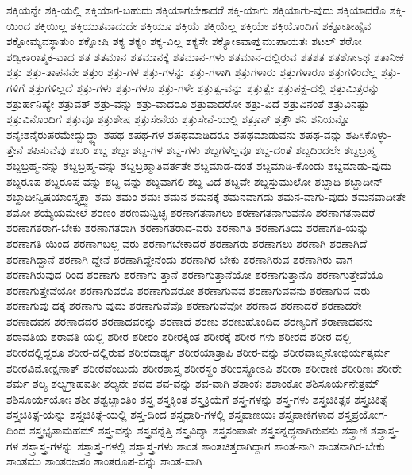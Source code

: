 {ಶಕ್ತಿಯನ್ನೇ
ಶಕ್ತಿ-ಯಲ್ಲಿ
ಶಕ್ತಿಯಾಗ-ಬಹುದು
ಶಕ್ತಿಯಾಗಬೇಕಾದರೆ
ಶಕ್ತಿ-ಯಾಗು
ಶಕ್ತಿಯಾಗು-ವುದು
ಶಕ್ತಿಯಾದರೊ
ಶಕ್ತಿ-ಯಿಂದ
ಶಕ್ತಿಯಿಲ್ಲ
ಶಕ್ತಿಯುತವಾದುದೇ
ಶಕ್ತಿಯೂ
ಶಕ್ತಿಯೆ
ಶಕ್ತಿಯೆಲ್ಲ
ಶಕ್ತಿಯೇ
ಶಕ್ತಿಯೊಂದಿಗೆ
ಶಕ್ನೋತೀಹೈವ
ಶಕ್ನೋಮ್ಯವಸ್ಥಾತುಂ
ಶಕ್ನೋಷಿ
ಶಕ್ಯ
ಶಕ್ಯಂ
ಶಕ್ಯ-ವಿಲ್ಲ
ಶಕ್ಯಸೇ
ಶಕ್ಯೋಽವಾಪ್ತುಮುಪಾಯತಃ
ಶಟಲ್
ಶಠೋ
ಶಡ್ವಿಕಾರಾತ್ಮಕ-ವಾದ
ಶತ
ಶತಮಾನ
ಶತಮಾನಕ್ಕೆ
ಶತಮಾನ-ಗಳು
ಶತಮಾನ-ದಲ್ಲಿರುವ
ಶತಶತ
ಶತಶೋಽಥ
ಶತಾನೀಕ
ಶತ್ರು
ಶತ್ರು-ತಾಪನನೇ
ಶತ್ರುಂ
ಶತ್ರು-ಗಳ
ಶತ್ರು-ಗಳನ್ನು
ಶತ್ರು-ಗಳಾಗಿ
ಶತ್ರುಗಳಾರು
ಶತ್ರುಗಳಾರೂ
ಶತ್ರುಗಳಿಂದೆಲ್ಲ
ಶತ್ರು-ಗಳಿಗೆ
ಶತ್ರುಗಳಿಲ್ಲದೆ
ಶತ್ರು-ಗಳು
ಶತ್ರು-ಗಳೂ
ಶತ್ರು-ಗಳೇ
ಶತ್ರುತ್ವ-ವನ್ನು
ಶತ್ರುತ್ವೇ
ಶತ್ರುಪಕ್ಷ-ದಲ್ಲಿ
ಶತ್ರುಮಿತ್ರರನ್ನು
ಶತ್ರುರ್ಹನಿಷ್ಯೇ
ಶತ್ರುವತ್
ಶತ್ರು-ವನ್ನು
ಶತ್ರು-ವಾದರೂ
ಶತ್ರುವಾದರೋ
ಶತ್ರು-ವಿದೆ
ಶತ್ರುವಿನಂತೆ
ಶತ್ರುವಿನಷ್ಟು
ಶತ್ರುವಿನೊಂದಿಗೆ
ಶತ್ರುವೂ
ಶತ್ರುಶೇಷ
ಶತ್ರುಸೇನೆಯ
ಶತ್ರುಸೇನೆ-ಯಲ್ಲಿ
ಶತ್ರೂನ್
ಶತ್ರೌ
ಶನಿ
ಶನಿಯನ್ನೊ
ಶನೈಃಶನೈರುಪರಮೇದ್ಬುದ್ಧ್ಯಾ
ಶಪಥ
ಶಪಥ-ಗಳ
ಶಪಥಮಾಡಿದರೂ
ಶಪಥಮಾಡುವನು
ಶಪಥ-ವನ್ನು
ಶಪಿಸಿಕೊಳ್ಳು-ತ್ತೇನೆ
ಶಪಿಸುವೆವು
ಶಬರಿ
ಶಬ್ದ
ಶಬ್ದಃ
ಶಬ್ದ-ಗಳ
ಶಬ್ದ-ಗಳು
ಶಬ್ದಗಳೆಲ್ಲವೂ
ಶಬ್ದ-ದಂತೆ
ಶಬ್ದದಿಂದಲೇ
ಶಬ್ದಬ್ರಹ್ಮ
ಶಬ್ದಬ್ರಹ್ಮ-ನನ್ನು
ಶಬ್ದಬ್ರಹ್ಮ-ವನ್ನು
ಶಬ್ದಬ್ರಹ್ಮಾತಿವರ್ತತೇ
ಶಬ್ದಮಾಡ-ದಂತೆ
ಶಬ್ದಮಾಡಿ-ಕೊಂಡು
ಶಬ್ದಮಾಡು-ವುದು
ಶಬ್ದರೂಪ
ಶಬ್ದರೂಪ-ವನ್ನು
ಶಬ್ದ-ವನ್ನು
ಶಬ್ದವಾಗಲಿ
ಶಬ್ದ-ವಿದೆ
ಶಬ್ದವೇ
ಶಬ್ದಸ್ತುಮುಲೋ
ಶಬ್ದಾದಿ
ಶಬ್ದಾದೀನ್
ಶಬ್ದಾದೀನ್ವಿಷಯಾಂಸ್ತ್ಯಕ್ತ್ವಾ
ಶಮ
ಶಮಂ
ಶಮಃ
ಶಮನ
ಶಮನಕ್ಕೆ
ಶಮನವಾಗದು
ಶಮನ-ವಾಗು-ವುದು
ಶಮನವಾದೀತೇ
ಶಮೋ
ಶಯ್ಯೆಯಮೇಲೆ
ಶರಣಂ
ಶರಣಮನ್ವಿಚ್ಛ
ಶರಣಾಗತನಾಗಲು
ಶರಣಾಗತನಾಗುವನೊ
ಶರಣಾಗತನಾದರೆ
ಶರಣಾಗತರಾಗ-ಬೇಕು
ಶರಣಾಗತರಾಗಿ
ಶರಣಾಗತರಾದ-ವರು
ಶರಣಾಗತಿ
ಶರಣಾಗತಿಯ
ಶರಣಾಗತಿ-ಯನ್ನು
ಶರಣಾಗತಿ-ಯಿಂದ
ಶರಣಾಗಬಲ್ಲ-ವರು
ಶರಣಾಗಬೇಕಾದರೆ
ಶರಣಾಗರು
ಶರಣಾಗಲು
ಶರಣಾಗಿ
ಶರಣಾಗಿದೆ
ಶರಣಾಗಿದ್ದಾನೆ
ಶರಣಾಗಿ-ದ್ದೇನೆ
ಶರಣಾಗಿದ್ದೇನೆಂದು
ಶರಣಾಗಿರ-ಬೇಕು
ಶರಣಾಗಿರುವ
ಶರಣಾಗಿರು-ವಾಗ
ಶರಣಾಗಿರುವುದ-ರಿಂದ
ಶರಣಾಗು
ಶರಣಾಗು-ತ್ತಾನೆ
ಶರಣಾಗುತ್ತಾನೆಯೋ
ಶರಣಾಗುತ್ತಾನೊ
ಶರಣಾಗುತ್ತೇವೆಯೊ
ಶರಣಾಗುತ್ತೇವೆಯೋ
ಶರಣಾಗುವರೊ
ಶರಣಾಗುವರೋ
ಶರಣಾಗುವವ
ಶರಣಾಗುವವನು
ಶರಣಾಗುವ-ವರು
ಶರಣಾಗುವು-ದಕ್ಕೆ
ಶರಣಾಗು-ವುದು
ಶರಣಾಗುವೆವೊ
ಶರಣಾಗುವೆವೋ
ಶರಣಾದ
ಶರಣಾದರೆ
ಶರಣಾದರೇ
ಶರಣಾದವನ
ಶರಣಾದವರ
ಶರಣಾದವರನ್ನು
ಶರಣಾದೆ
ಶರಣು
ಶರಣುಹೊಂದಿದ
ಶರಣ್ಯರಿಗೆ
ಶರಾಣಾದವನು
ಶರಾವತಿಯ
ಶರಾವತಿ-ಯಲ್ಲಿ
ಶರೀರ
ಶರೀರಂ
ಶರೀರಕ್ಕಿಂತ
ಶರೀರಕ್ಕೆ
ಶರೀರ-ಗಳು
ಶರೀರದ
ಶರೀರ-ದಲ್ಲಿ
ಶರೀರದಲ್ಲಿದ್ದರೂ
ಶರೀರ-ದಲ್ಲಿರುವ
ಶರೀರದಾರ್ಢ್ಯ
ಶರೀರಯಾತ್ರಾಪಿ
ಶರೀರ-ವನ್ನು
ಶರೀರವಾಙ್ಮನೋಭಿರ್ಯತ್ಕರ್ಮ
ಶರೀರವಿಮೋಕ್ಷಣಾತ್
ಶರೀರವೆಂಬುದು
ಶರೀರಶಾಸ್ತ್ರ
ಶರೀರಸ್ಥಂ
ಶರೀರಸ್ಥೋಽಪಿ
ಶರೀರಾ
ಶರೀರಾಣಿ
ಶರೀರಿಣಃ
ಶರೀರೇ
ಶರ್ಮ
ಶಲ್ಯ
ಶಲ್ಯಗ್ರಾಹವತೀ
ಶಲ್ಯನೇ
ಶವದ
ಶವ-ವನ್ನು
ಶವ-ವಾಗಿ
ಶಶಾಂಕಃ
ಶಶಾಂಕೋ
ಶಶಿಸೂರ್ಯನೇತ್ರಮ್
ಶಶಿಸೂರ್ಯಯೋಃ
ಶಶೀ
ಶಶ್ವಚ್ಛಾಂತಿಂ
ಶಸ್ತ್ರ
ಶಸ್ತ್ರಕ್ಕಿಂತ
ಶಸ್ತ್ರಕ್ರಿಯೆಗೆ
ಶಸ್ತ್ರ-ಗಳನ್ನು
ಶಸ್ತ್ರ-ಗಳು
ಶಸ್ತ್ರಚಿಕಿತ್ಸಕ
ಶಸ್ತ್ರಚಿಕಿತ್ಸೆ
ಶಸ್ತ್ರಚಿಕಿತ್ಸೆ-ಯನ್ನು
ಶಸ್ತ್ರಚಿಕಿತ್ಸೆ-ಯಲ್ಲಿ
ಶಸ್ತ್ರ-ದಿಂದ
ಶಸ್ತ್ರಧಾರಿ-ಗಳಲ್ಲಿ
ಶಸ್ತ್ರಪಾಣಯಃ
ಶಸ್ತ್ರಪಾಣಿಗಳಾದ
ಶಸ್ತ್ರಪ್ರಯೋಗ-ದಿಂದ
ಶಸ್ತ್ರಭೃತಾಮಹಮ್
ಶಸ್ತ್ರ-ವನ್ನು
ಶಸ್ತ್ರವನ್ನೆತ್ತಿ
ಶಸ್ತ್ರವಿದ್ಯಾ
ಶಸ್ತ್ರಸಂಪಾತೇ
ಶಸ್ತ್ರಸನ್ನದ್ಧನಾಗಿರುವನು
ಶಸ್ತ್ರಾಣಿ
ಶಸ್ತ್ರಾಸ್ತ್ರ-ಗಳ
ಶಸ್ತ್ರಾಸ್ತ್ರ-ಗಳನ್ನು
ಶಸ್ತ್ರಾಸ್ತ್ರ-ಗಳಲ್ಲಿ
ಶಸ್ತ್ರಾಸ್ತ್ರ-ಗಳು
ಶಾಂತ
ಶಾಂತಚಿತ್ತರಾಗಿದ್ದಾಗ
ಶಾಂತ-ನಾಗಿ
ಶಾಂತನಾಗಿರ-ಬೇಕು
ಶಾಂತಮು
ಶಾಂತರಜಸಂ
ಶಾಂತರೂಪ-ವನ್ನು
ಶಾಂತ-ವಾಗಿ
}
